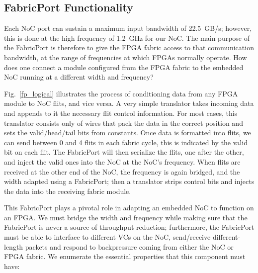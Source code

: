 \subsection{FabricPort Functionality}
%

Each NoC port can sustain a maximum input bandwidth of 22.5~GB/s; however, this is done at the high frequency of 1.2~GHz for our NoC.
The main purpose of the FabricPort is therefore to give the FPGA fabric access to that communication bandwidth, at the range of frequencies at which FPGAs normally operate.
How does one connect a module configured from the FPGA fabric to the embedded NoC running at a different width and frequency?

%
%

Fig.~\ref{fp_logical} illustrates the process of conditioning data from any FPGA module to NoC flits, and vice versa.
A very simple translator takes incoming data and appends to it the necessary flit control information.
For most cases, this translator consists only of wires that pack the data in the correct position and sets the valid/head/tail bits from constants.
Once data is formatted into flits, we can send between 0 and 4 flits in each fabric cycle, this is indicated by the valid bit on each flit.
The FabricPort will then serialize the flits, one after the other, and inject the valid ones into the NoC at the NoC's frequency.
When flits are received at the other end of the NoC, the frequency is again bridged, and the width adapted using a FabricPort; then a translator strips control bits and injects the data into the receiving fabric module.

This FabricPort plays a pivotal role in adapting an embedded NoC to function on an FPGA.
We must bridge the width and frequency while making sure that the FabricPort is never a source of throughput reduction; furthermore, the FabricPort must be able to interface to different VCs on the NoC, send/receive different-length packets and respond to backpressure coming from either the NoC or FPGA fabric.
We enumerate the essential properties that this component must have:

